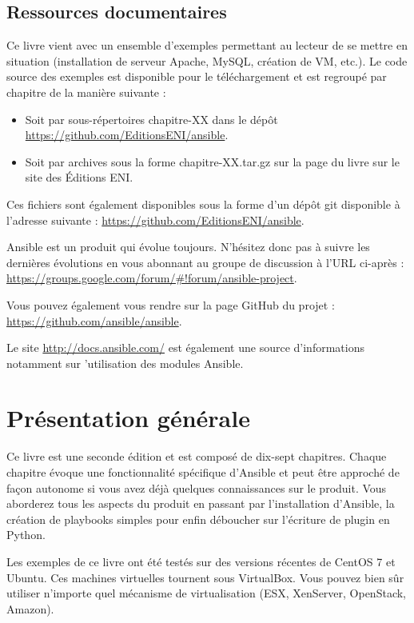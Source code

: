 \documentclass[hidelinks]{article}
\begin{document}
\subsection{Ressources documentaires}
Ce livre vient avec un ensemble d'exemples permettant au lecteur de se mettre en situation (installation de serveur Apache, MySQL, création de VM, etc.). Le code source des exemples est disponible pour le téléchargement et est regroupé par chapitre de la manière suivante :
\begin{itemize}
    \item Soit par sous-répertoires chapitre-XX dans le dépôt \url{https://github.com/EditionsENI/ansible}.
    \item Soit par archives sous la forme chapitre-XX.tar.gz sur la page du livre sur le site des Éditions ENI.
\end{itemize}

Ces fichiers sont également disponibles sous la forme d'un dépôt git disponible à l'adresse suivante : \url{https://github.com/EditionsENI/ansible}.

Ansible est un produit qui évolue toujours. N'hésitez donc pas à suivre les dernières évolutions en vous abonnant au groupe de discussion à l'URL ci-après : \url{https://groups.google.com/forum/#!forum/ansible-project}.

Vous pouvez également vous rendre sur la page GitHub du projet : \url{https://github.com/ansible/ansible}.

Le site \url{http://docs.ansible.com/} est également une source d'informations notamment sur 'utilisation des modules Ansible.

\section{Présentation générale}

Ce livre est une seconde édition et est composé de dix-sept chapitres. Chaque chapitre évoque une fonctionnalité spécifique d'Ansible et peut être approché de façon autonome si vous avez déjà quelques connaissances sur le produit. Vous aborderez tous les aspects du produit en passant par l'installation d'Ansible, la création de playbooks simples pour enfin déboucher sur l'écriture de plugin en Python.

Les exemples de ce livre ont été testés sur des versions récentes de CentOS 7 et Ubuntu. Ces machines virtuelles tournent sous VirtualBox. Vous pouvez bien sûr utiliser n'importe quel mécanisme de virtualisation (ESX, XenServer, OpenStack, Amazon).
\end{document}
